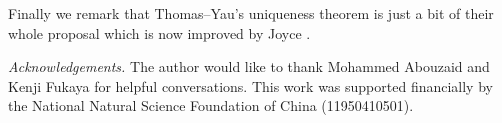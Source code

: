 \documentclass{article}
\theoremstyle{plain}%
\theoremstyle{definition}
\numberwithin{equation}{section}
\numberwithin{figure}{section}
\begin{document}

Finally we remark that Thomas--Yau's uniqueness theorem is just a bit of their whole proposal \cite{TY} which is now improved by Joyce \cite{Jc}.

{\it Acknowledgements.}
The author would like to thank Mohammed Abouzaid and Kenji Fukaya for helpful conversations.
This work was supported financially by the National Natural Science Foundation of China (11950410501).
\end{document}
